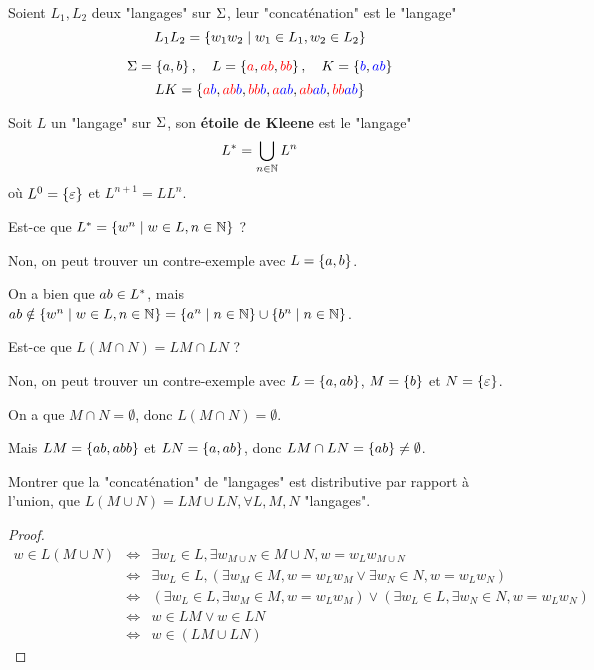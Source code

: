 \begin{definition}
	Soient $L_1, L_2$ deux "langages" sur $\Sigma$, leur "concaténation" est le "langage"
	$$
		L_1L_2 = \left\{w_1w_2 \mid w_1 \in L_1, w_2 \in L_2\right\}
	$$
\end{definition}

\begin{exemple}
	$$ \Sigma = \left\{a, b\right\}, \quad L = \left\{\textcolor{red}{a}, \textcolor{red}{ab}, \textcolor{red}{bb}\right\}, \quad K = \left\{\textcolor{blue}{b}, \textcolor{blue}{ab}\right\} $$
	$$ LK = \left\{\textcolor{red}{a} \textcolor{blue}{b}, \textcolor{red}{ab} \textcolor{blue}{b}, \textcolor{red}{bb} \textcolor{blue}{b}, \textcolor{red}{a} \textcolor{blue}{ab}, \textcolor{red}{ab} \textcolor{blue}{ab}, \textcolor{red}{bb} \textcolor{blue}{ab}\right\} $$
\end{exemple}


\begin{definition}
	Soit $L$ un "langage" sur $\Sigma$, son \textbf{étoile de Kleene} est le "langage"
	$$
		L^{*} = \bigcup_{n \in \mathbb{N}} L^n
	$$
	où $L^0 = \left\{\varepsilon\right\}$ et $L^{n+1} = LL^n$.
\end{definition}

\begin{remarque}
	Est-ce que $L^{*} = \left\{w^n \mid w \in L, n \in \mathbb{N}\right\}$ ?

	Non, on peut trouver un contre-exemple avec $L = \left\{a, b\right\}$.

	On a bien que $ab \in L^{*}$, mais $ab \notin \left\{w^n \mid w \in L, n \in \mathbb{N}\right\} = \left\{a^n \mid n \in \mathbb{N}\right\} \cup \left\{b^n \mid n \in \mathbb{N}\right\}$.
\end{remarque}

\begin{remarque}
	Est-ce que $L(M \cap N) = LM \cap LN$ ?

	Non, on peut trouver un contre-exemple avec $L = \left\{a, ab\right\}$, $M = \left\{b\right\}$ et $N = \left\{\varepsilon\right\}$.

	On a que $M \cap N = \emptyset$, donc $L(M \cap N) = \emptyset$.

	Mais $LM = \left\{ab, abb\right\}$ et $LN = \left\{a, ab\right\}$, donc $LM \cap LN = \left\{ab\right\} \neq \emptyset$.
\end{remarque}

\begin{exercice}
	Montrer que la "concaténation" de "langages" est distributive par rapport à l'union, \ie que $L(M \cup N) = LM \cup LN, \forall L, M, N$ "langages".
\end{exercice}

\begin{proof}
	\begin{eqnarray*}
		w \in L(M \cup N) &\iff& \exists w_L \in L, \exists w_{M \cup N} \in M \cup N, w = w_Lw_{M \cup N} \\
		&\iff& \exists w_L \in L, (\exists w_M \in M, w = w_Lw_M \lor \exists w_N \in N, w = w_Lw_N) \\
		&\iff& (\exists w_L \in L, \exists w_M \in M, w = w_Lw_M) \lor (\exists w_L \in L,\exists w_N \in N, w = w_Lw_N) \\
		&\iff& w \in LM \lor w \in LN  \\
		&\iff& w \in (LM \cup LN)
	\end{eqnarray*}
\end{proof}


